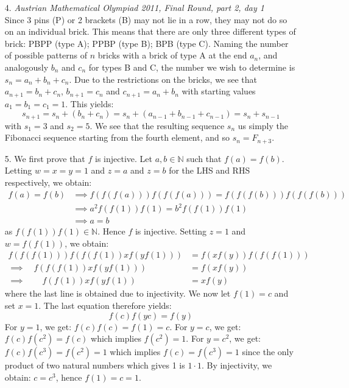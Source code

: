 \documentclass[a4paper, 12pt]{article}
\begin{document}
\begin{enumerate}
    \item[4.] \textit{Austrian Mathematical Olympiad 2011, Final Round, part 2, day 1} \\ Since 3 pins (P) or 2 brackets (B) may not lie in a row, they may not do so on an individual brick. This means that there are only three different types of brick: PBPP (type A); PPBP (type B); BPB (type C). Naming the number of possible patterns of $n$ bricks with a brick of type A at the end $a_n$, and analogously $b_n$ and $c_n$ for types B and C, the number we wish to determine is $s_n=a_n+b_n+c_n$. Due to the restrictions on the bricks, we see that $a_{n+1}=b_n+c_n$, $b_{n+1}=c_n$ and $c_{n+1}=a_n+b_n$ with starting values $a_1=b_1=c_1=1$. This yields:
\begin{equation*}
s_{n+1}=s_n+(b_n+c_n)=s_n+(a_{n-1}+b_{n-1}+c_{n-1})=s_n+s_{n-1}
\end{equation*}
with $s_1=3$ and $s_2=5$. We see that the resulting sequence $s_n$ us simply the Fibonacci sequence starting from the fourth element, and so $s_n=F_{n+3}$.
    
    
    \item[5.] We first prove that $f$ is injective. Let $a, b \in \mathbb{N}$ such that $f(a) = f(b)$. Letting $w = x = y = 1$ and $z = a$ and $z = b$ for the LHS and RHS respectively, we obtain:
    \begin{align*}
        f(a) = f(b) &\implies f(f(f(a))) f(f(f(a))) =  f(f(f(b))) f(f(f(b))) \\
        &\implies a^2 f(f(1)) f(1) = b^2 f(f(1)) f(1) \\ &\implies a = b
    \end{align*} 
    as $f(f(1)) f(1) \in \mathbb{N}$. Hence $f$ is injective. Setting $z = 1$ and $w = f(f(1))$, we obtain:
    \begin{align*}
        f(f(f(1))) f(f(f(1)) x f(yf(1))) &= f(xf(y)) f(f(f(1))) \\
        \implies \quad f(f(f(1)) x f(yf(1))) &= f(xf(y)) \\
        \implies \qquad f(f(1)) x f(yf(1)) &= x f(y)
    \end{align*}
    where the last line is obtained due to injectivity. We now let $f(1) = c$ and set $x = 1$. The last equation therefore yields:
    $$ f(c) f(yc) = f(y) $$
    For $y = 1$, we get: $f(c) f(c) = f(1) = c$. For $y = c$, we get: $f(c) f(c^2) = f(c)$ which implies $f(c^2) = 1$. For $y = c^2$, we get: $f(c) f(c^3) = f(c^2) = 1$ which implies $f(c) = f(c^3) = 1$ since the only product of two natural numbers which gives 1 is $1 \cdot 1$. By injectivity, we obtain: $c = c^3$, hence $f(1) = c = 1$.
    

\end{enumerate}
\end{document}

